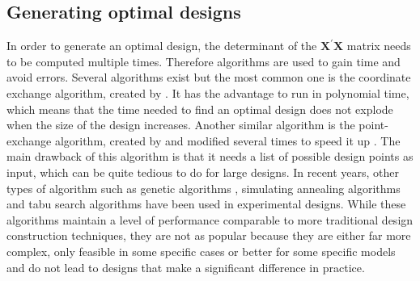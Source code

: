 \subsection{Generating optimal designs}
In order to generate an optimal design, the determinant of the $\mathbf{X}^{\prime}\mathbf{X}$ matrix needs to be computed 
multiple times. 
Therefore algorithms are used to gain time and avoid errors. 
Several algorithms exist but the most common one is 
the coordinate exchange algorithm, created by \textcite{meyer_coordinate-exchange_1995}. 
It has the advantage to run in polynomial time, which means that the time needed to find an optimal design does not explode when 
the size of the design increases. 
Another similar algorithm is the point-exchange algorithm, created by \textcite{fedorov_theory_1972} and modified several times to speed 
it up \parencite{johnson_guidelines_1983,atkinson_construction_1989}. The main drawback of this algorithm is that it needs a list of 
possible design points as input, which can be quite tedious to do for large designs. In recent years, other types of algorithm 
such as genetic algorithms \parencite{heredia-langner_genetic_2003,heredia-langner_model-robust_2004}, simulating annealing algorithms 
\parencite{bohachevsky_generalized_1986,meyer_constructing_1988} and tabu search algorithms \parencite{jung_construction_1996} have 
been used in experimental designs. While these algorithms maintain a level of performance comparable to more traditional design 
construction techniques, they are not as popular because they are either far more complex, only feasible in some specific cases 
or better for some specific models and do not lead to designs that make a significant difference in practice.


